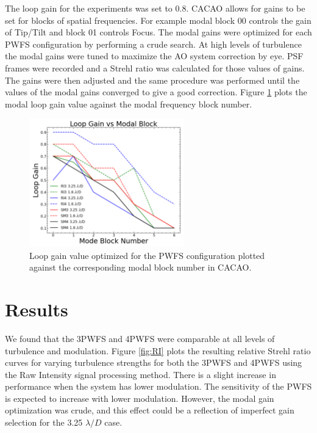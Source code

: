 The loop gain for the experiments was set to 0.8. CACAO allows for gains to be set for blocks of spatial frequencies. For example modal block 00 controls the gain of Tip/Tilt and block 01 controls Focus. The modal gains were optimized for each PWFS configuration by performing a crude search. At high levels of turbulence the modal gains were tuned to maximize the AO system correction by eye. PSF frames were recorded and a Strehl ratio was calculated for those values of gains. The gains were then adjusted and the same procedure was performed until the values of the modal gains converged to give a good correction. Figure \ref{fig:gains} plots the modal loop gain value against the modal frequency block number.

\begin{figure}
    \centering
    \includegraphics[width=0.6\textwidth]{Chapter Materials/Chapter Five Materials/ModeVsLoopGain.png}
    \caption{Loop gain value optimized for the PWFS configuration plotted against the corresponding modal block number in CACAO.}
    \label{fig:gains}
\end{figure}

\section{Results}

We found that the 3PWFS and 4PWFS were comparable at all levels of turbulence and modulation. Figure \ref{fig:RI} plots the resulting relative Strehl ratio curves for varying turbulence strengths for both the 3PWFS and 4PWFS using the Raw Intensity signal processing method. There is a slight increase in performance when the system has lower modulation. The sensitivity of the PWFS is expected to increase with lower modulation. However, the modal gain optimization was crude, and this effect could be a reflection of imperfect gain selection for the 3.25 $\lambda/D$ case. 


